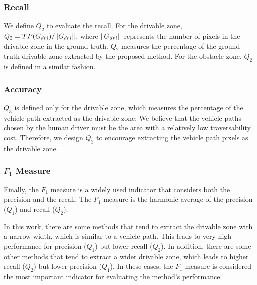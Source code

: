\documentclass[letterpaper, 10 pt, conference]{ieeeconf}  %
\begin{document}
\subsubsection{Recall}
We define $Q_2$ to evaluate the recall. For the drivable zone, $Q_2={TP(G_{dri})}/{\Arrowvert G_{dri} \Arrowvert}$, where ${\Arrowvert G_{dri} \Arrowvert}$ represents the number of pixels in the drivable zone in the ground truth. $Q_2$ measures the percentage of the ground truth drivable zone extracted by the proposed method. For the obstacle zone, $Q_2$ is defined in a similar fashion.
\subsubsection{Accuracy}
$Q_3$ is defined only for the drivable zone, which measures the percentage of the vehicle path extracted as the drivable zone. We believe that the vehicle paths chosen by the human driver must be the area with a relatively low traversability cost. Therefore, we design $Q_3$ to encourage extracting the vehicle path pixels as the drivable zone.
\subsubsection{$F_1$ Measure}
Finally, the $F_1$ measure is a widely used indicator that considers both the precision and the recall. The $F_1$ measure is the harmonic average of the precision ($Q_1$) and recall ($Q_2$). 

In this work, there are some methods that tend to extract the drivable zone with a narrow-width, which is similar to a vehicle path. This leads to very high performance for precision ($Q_1$) but lower recall ($Q_2$). In addition, there are some other methods that tend to extract a wider drivable zone, which leads to higher recall ($Q_2$) but lower precision ($Q_1$). In these cases, the $F_1$ measure is considered the most important indicator for evaluating the method’s performance.
\end{document}
